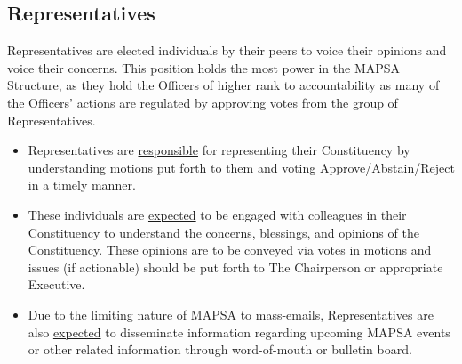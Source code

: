 \documentclass[8pt]{article}
\begin{document}
	\subsection{Representatives}
	Representatives are elected individuals by their peers to voice their opinions and voice their concerns. This position holds the most power in the MAPSA Structure, as they hold the Officers of higher rank to accountability as many of the Officers' actions are regulated by approving votes from the group of Representatives.
	\begin{itemize}
		\item Representatives are \underline{responsible} for representing their Constituency by understanding motions put forth to them and voting Approve/Abstain/Reject in a timely manner.
		\item These individuals are \underline{expected} to be engaged with colleagues in their Constituency to understand the concerns, blessings, and opinions of the Constituency. These opinions are to be conveyed via votes in motions and issues (if actionable) should be put forth to The Chairperson or appropriate Executive.
		\item Due to the limiting nature of MAPSA to mass-emails, Representatives are also \underline{expected} to disseminate information regarding upcoming MAPSA events or other related information through word-of-mouth or bulletin board.
	\end{itemize}
\end{document}
